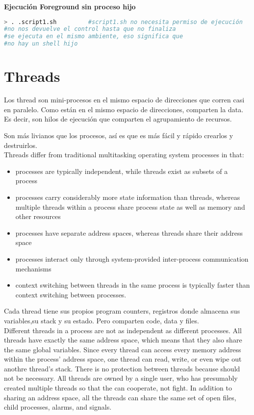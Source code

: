 \documentclass[a4paper, twoside]{article}
\begin{document}
\textbf{Ejecución Foreground sin proceso hijo}
\begin{lstlisting}[language=sh]
> . .script1.sh 		#script1.sh no necesita permiso de ejecución
#no nos devuelve el control hasta que no finaliza
#se ejecuta en el mismo ambiente, eso significa que
#no hay un shell hijo
\end{lstlisting}

\newpage
\section{Threads}
Los thread son mini-procesos en el mismo espacio de direcciones que corren casi en paralelo. Como están en el mismo espacio de direcciones, comparten la data. Es decir, son hilos de ejecución que comparten el agrupamiento de recursos.

Son más livianos que los procesos, así es que es más fácil y rápido crearlos y destruirlos.\\

Threads differ from traditional multitasking operating system processes in that:
\begin{itemize}
	\item processes are typically independent, while threads exist as subsets of a process
	\item processes carry considerably more state information than threads, whereas multiple threads within a process share process state as well as memory and other resources
	\item processes have separate address spaces, whereas threads share their address space
	\item processes interact only through system-provided inter-process communication mechanisms
	\item context switching between threads in the same process is typically faster than context switching between processes.
\end{itemize}

Cada thread tiene sus propios program counters, registros donde almacena sus variables,su stack y su estado. Pero comparten code, data y files.\\

Different threads in a process are not as independent as different processes. All threads have exactly the same address space, which means that they also share the same global variables. Since every thread can access every memory address within the process’ address space, one thread can read, write, or even wipe out anothre thread’s stack. There is no protection between threads because should not be necessary. All threads are owned by a single user, who has presumably created multiple threads so that the can cooperate, not fight. In addition to sharing an address space, all the threads can share the same set of open files, child processes, alarms, and signals.
\end{document}
